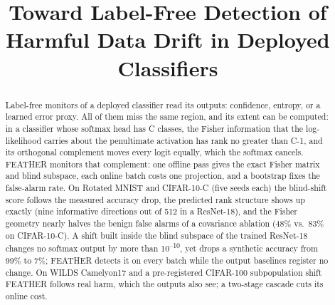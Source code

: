 \documentclass[conference]{IEEEtran}
\begin{document}
\title{Toward Label-Free Detection of Harmful Data Drift in Deployed Classifiers}

\author{
\and
{}
\and
{}
}

\maketitle
\thispagestyle{firstpage}

\begin{abstract}
Label-free monitors of a deployed classifier read its outputs: confidence,
entropy, or a learned error proxy. All of them miss the same region, and its
extent can be computed: in a classifier whose softmax head has C classes, the
Fisher information that the log-likelihood carries about the penultimate
activation has rank no greater than C-1, and its orthogonal complement moves every logit equally, which the
softmax cancels. FEATHER monitors that complement: one offline pass gives the
exact Fisher matrix and blind subspace, each online batch costs one
projection, and a bootstrap fixes the false-alarm rate. On Rotated MNIST and
CIFAR-10-C (five seeds each) the blind-shift score follows the measured
accuracy drop, the predicted rank structure shows up exactly (nine informative
directions out of 512 in a ResNet-18), and the Fisher geometry nearly halves
the benign false alarms of a covariance ablation (48\% vs.\ 83\% on
CIFAR-10-C). A shift built inside the blind subspace of the trained ResNet-18
changes no softmax output by more than 10\textsuperscript{--10}, yet drops a
synthetic accuracy from 99\% to 7\%; FEATHER detects it on every batch while the
output baselines register no change. On WILDS Camelyon17 and a pre-registered
CIFAR-100 subpopulation shift FEATHER follows real harm, which the outputs
also see; a two-stage cascade cuts its online cost.
\end{abstract}
\end{document}
